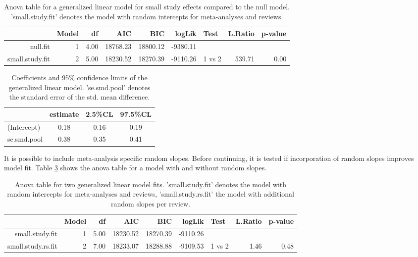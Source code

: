 \documentclass[11pt,a4paper,twoside]{book}\usepackage[]{graphicx}\usepackage[]{color}
\begin{document}
\begin{table}[ht]
\centering
\begingroup\scriptsize
\begin{tabular}{rrrrrrlrr}
  \hline
 & Model & df & AIC & BIC & logLik & Test & L.Ratio & p-value \\ 
  \hline
null.fit &   1 & 4.00 & 18768.23 & 18800.12 & -9380.11 &  &  &  \\ 
  small.study.fit &   2 & 5.00 & 18230.52 & 18270.39 & -9110.26 & 1 vs 2 & 539.71 & 0.00 \\ 
   \hline
\end{tabular}
\endgroup
\caption{Anova table for a generalized linear model for small study effects compared to the null model. 'small.study.fit' denotes the model with random intercepts for meta-analyses and reviews.} 
\label{anova.small.study}
\end{table}


\begin{table}[ht]
\centering
\begingroup\scriptsize
\begin{tabular}{lccc}
  \hline
 & estimate & 2.5\%CL & 97.5\%CL \\ 
  \hline
(Intercept) & 0.18 & 0.16 & 0.19 \\ 
  se.smd.pool & 0.38 & 0.35 & 0.41 \\ 
   \hline
\end{tabular}
\endgroup
\caption{Coefficients and 95\% confidence limits of the generalized linear model. 'se.smd.pool' denotes the standard error of the std. mean difference.} 
\label{coefficients.small.study}
\end{table}


It is possible to include meta-analysis specific random slopes. Before continuing, it is tested if incorporation of random slopes improves model fit. Table \ref{anova.random.slopes} shows the anova table for a model with and without random slopes.

\begin{table}[ht]
\centering
\begingroup\scriptsize
\begin{tabular}{rrrrrrlrr}
  \hline
 & Model & df & AIC & BIC & logLik & Test & L.Ratio & p-value \\ 
  \hline
small.study.fit &   1 & 5.00 & 18230.52 & 18270.39 & -9110.26 &  &  &  \\ 
  small.study.rs.fit &   2 & 7.00 & 18233.07 & 18288.88 & -9109.53 & 1 vs 2 & 1.46 & 0.48 \\ 
   \hline
\end{tabular}
\endgroup
\caption{Anova table for two generalized linear model fits. 'small.study.fit' denotes the model with random intercepts for meta-analyses and reviews, 'small.study.rs.fit' the model with additional random slopes per review.} 
\label{anova.random.slopes}
\end{table}
\end{document}
